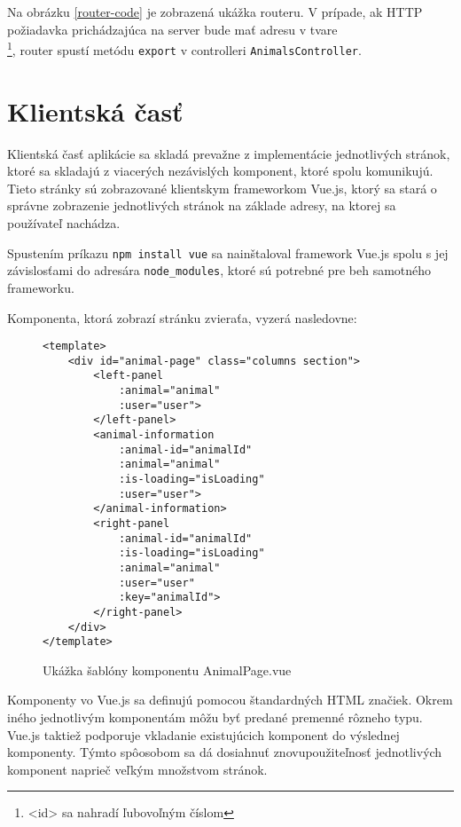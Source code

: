 Na obrázku \ref{router-code} je zobrazená ukážka routeru. V prípade, ak HTTP požiadavka prichádzajúca na server bude mať adresu v tvare\\ \footnote{<id> sa nahradí ľubovoľným číslom}, router spustí metódu \texttt{export} v controlleri \texttt{AnimalsController}.

\section{Klientská časť}
Klientská časť aplikácie sa skladá prevažne z implementácie jednotlivých stránok, ktoré sa skladajú z viacerých nezávislých komponent, ktoré spolu komunikujú. Tieto stránky sú zobrazované klientskym frameworkom Vue.js, ktorý sa stará o správne zobrazenie jednotlivých stránok na základe adresy, na ktorej sa používateľ nachádza.

Spustením príkazu \texttt{npm install vue} sa nainštaloval framework Vue.js spolu s jej závislosťami do adresára \texttt{node_modules}, ktoré sú potrebné pre beh samotného frameworku.

Komponenta, ktorá zobrazí stránku zvieraťa, vyzerá nasledovne:

\begin{figure}[H]
\begin{verbatim}
<template>
    <div id="animal-page" class="columns section">
        <left-panel
            :animal="animal"
            :user="user">
        </left-panel>
        <animal-information
            :animal-id="animalId"
            :animal="animal"
            :is-loading="isLoading"
            :user="user">
        </animal-information>
        <right-panel
            :animal-id="animalId"
            :is-loading="isLoading"
            :animal="animal"
            :user="user"
            :key="animalId">
        </right-panel>
    </div>
</template>
\end{verbatim}
\caption[Ukážka šablóny komponentu AnimalPage.vue]
{Ukážka šablóny komponentu AnimalPage.vue}
\label{animal-page-vue-code}
\end{figure}

Komponenty vo Vue.js sa definujú pomocou štandardných HTML značiek. Okrem iného jednotlivým komponentám môžu byť predané premenné rôzneho typu. Vue.js taktiež podporuje vkladanie existujúcich komponent do výslednej komponenty. Týmto spôosobom sa dá dosiahnuť znovupoužiteľnosť jednotlivých komponent naprieč veľkým množstvom stránok.

